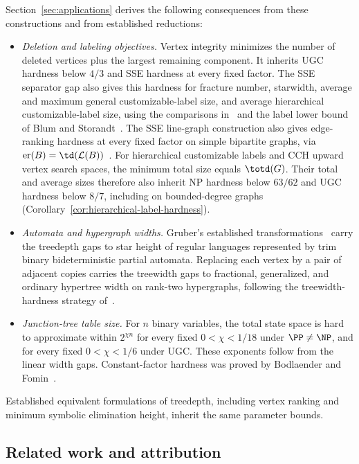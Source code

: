 Section~\ref{sec:applications} derives the following consequences
from these constructions and from established reductions:
\begin{itemize}
 \item \emph{Deletion and labeling objectives.} Vertex integrity
   minimizes the number of deleted vertices plus the largest remaining
   component. It inherits UGC hardness below $4/3$ and SSE hardness at every fixed
   factor. The SSE separator gap also gives this hardness for fracture
   number, starwidth, average and maximum general customizable-label size,
   and average hierarchical customizable-label size, using the comparisons
   in~\cite{GimaEtAlIntegrity} and the label lower bound
   of Blum and Storandt~\cite{BlumStorandt2023}.
   The SSE line-graph construction also gives edge-ranking hardness
   at every fixed factor on simple bipartite graphs, via
    $\operatorname{er}(B)=\td(\mathcal L(B))$~\cite{BodlaenderRankings}.
   For hierarchical customizable labels and CCH upward vertex search
   spaces, the minimum total size equals $\totd(G)$. Their total and
   average sizes therefore also inherit NP hardness below $63/62$
   and UGC hardness below $8/7$, including on bounded-degree graphs
   (Corollary~\ref{cor:hierarchical-label-hardness}).
 \item \emph{Automata and hypergraph widths.} Gruber's established
   transformations~\cite{Gruber2008} carry the treedepth gaps to
   star height of regular languages represented by trim binary
   bideterministic partial automata. Replacing each vertex
   by a pair of adjacent copies carries the treewidth gaps to fractional, generalized,
   and ordinary hypertree width on rank-two hypergraphs, following
   the treewidth-hardness strategy of~\cite{Marx2010Fractional}.
 \item \emph{Junction-tree table size.} For $n$ binary variables, the
   total state space is hard to approximate within $2^{\chi n}$
   for every fixed $0<\chi<1/18$ under $\PP\ne\NP$, and for
   every fixed $0<\chi<1/6$ under UGC. These exponents
   follow from the linear width gaps. Constant-factor hardness
   was proved by Bodlaender and Fomin~\cite{BodlaenderFomin2005}.
\end{itemize}
Established equivalent formulations of treedepth, including vertex
ranking and minimum symbolic elimination height, inherit the same
parameter bounds.

\subsection{Related work and attribution}

